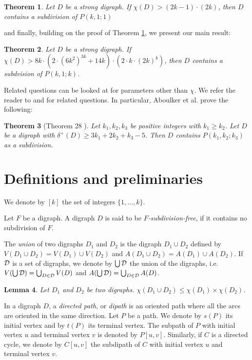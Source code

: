 \documentclass[utf8,10pt]{article}
\theoremstyle{plain}
\newtheorem{theorem}{Theorem}
\newtheorem{lemma}[theorem]{Lemma}
\theoremstyle{definition}
\theoremstyle{remark}
\newcommand{\cste}{ 8k \cdot (2\cdot \col + 14k) \cdot (2 \cdot \dr)}
\newcommand{\dr}{ k \cdot (2k)^k}
\newcommand{\col}{(6k^2)^{3k}}
\begin{document}
\begin{theorem}\label{th:P11k}
Let $D$ be a strong digraph. If $\chi(D) >  (2k-1)\cdot (2k)$, then $D$ contains a subdivision of $P(k,1;1)$
\end{theorem}

and finally, building on the proof of Theorem \ref{th:P11k}, we present our main result: 

\begin{theorem}\label{th:main}
Let $D$ be a strong digraph. If $\chi(D) > \cste$, then $D$ contains a subdvision of $P(k,1;k)$.
\end{theorem}

Related questions can be looked at for parameters other than $\chi$. We refer the reader to \cite{AC+16} and \cite{CHLN16} for related questions.
In particular, Aboulker et al. prove the following:

\begin{theorem}[Theorem 28 \cite{AC+16}]
Let $k_1,k_2,k_3$ be  positive integers with $k_1 \ge k_2$.
Let $D$ be a digraph with $\delta^+(D) \geq 3k_1+2k_2+k_3-5$. Then $D$ contains $P(k_1,k_2;k_3)$ as a subdivision.
\end{theorem}


\section{Definitions and preliminaries}


We denote by $[k]$ the set of integers $\{1, \dots , k\}$.

Let $F$ be a digraph.
A digraph $D$ is said to be {\it $F$-subdivision-free}, if it contains no subdivision of $F$.

The {\it union} of two digraphs $D_1$ and $D_2$ is the digraph  $D_1\cup D_2$ defined by $V(D_1\cup D_2) = V(D_1)\cup V(D_2)$ and 
$A(D_1\cup D_2) = A(D_1)\cup A(D_2)$.
If ${\cal D}$ is a set of digraphs, we denote by $\bigcup {\cal D}$ the union of the digraphs, i.e. $V(\bigcup {\cal D}) =\bigcup_{D\in {\cal D}} V(D)$
and $A(\bigcup {\cal D}) =\bigcup_{D\in {\cal D}} A(D)$.

\begin{lemma}\label{lem:decomp}
Let $D_1$ and $D_2$ be two digraphs.
$\chi(D_1\cup D_2) \leq \chi(D_1)\times \chi(D_2)$.
\end{lemma}



In a digraph $D$, a \emph{directed path}, or \emph{dipath} is an oriented path where all the arcs are oriented in the same direction.
Let $P$ be a path. We denote by $s(P)$ its initial vertex and by $t(P)$ its terminal vertex.
The subpath of $P$ with initial vertex $u$ and terminal vertex $v$ is denoted by $P[u,v]$.
Similarly, if $C$ is a directed cycle, we denote by $C[u,v]$ the subdipath of $C$ with initial vertex $u$ and terminal vertex $v$.
\end{document}
